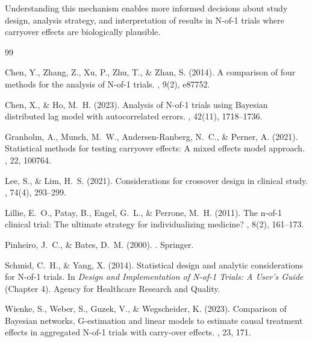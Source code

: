 \documentclass[11pt,letterpaper]{article}
\begin{document}
Understanding this mechanism enables more informed decisions about study
design, analysis strategy, and interpretation of results in N-of-1 trials
where carryover effects are biologically plausible.



\begin{thebibliography}{99}

Chen, Y., Zhang, Z., Xu, P., Zhu, T., \& Zhan, S. (2014).
\newblock A comparison of four methods for the analysis of N-of-1 trials.
, 9(2), e87752.

Chen, X., \& Ho, M.~H. (2023).
\newblock Analysis of N-of-1 trials using {B}ayesian distributed lag model
with autocorrelated errors.
, 42(11), 1718--1736.

Granholm, A., Munch, M.~W., Andersen-Ranberg, N.~C., \& Perner, A. (2021).
\newblock Statistical methods for testing carryover effects: A mixed effects
model approach.
, 22, 100764.

Lee, S., \& Lim, H.~S. (2021).
\newblock Considerations for crossover design in clinical study.
, 74(4), 293--299.

Lillie, E.~O., Patay, B., Engel, G.~L., \& Perrone, M.~H. (2011).
\newblock The n-of-1 clinical trial: The ultimate strategy for individualizing
medicine?
, 8(2), 161--173.

Pinheiro, J.~C., \& Bates, D.~M. (2000).
.
\newblock Springer.

Schmid, C.~H., \& Yang, X. (2014).
\newblock Statistical design and analytic considerations for N-of-1 trials.
\newblock In {\em Design and Implementation of N-of-1 Trials: A User's Guide}
(Chapter 4). Agency for Healthcare Research and Quality.

Wienke, S., Weber, S., Guzek, V., \& Wegscheider, K. (2023).
\newblock Comparison of {B}ayesian networks, {G}-estimation and linear models
to estimate causal treatment effects in aggregated N-of-1 trials with
carry-over effects.
, 23, 171.

\end{thebibliography}
\end{document}
